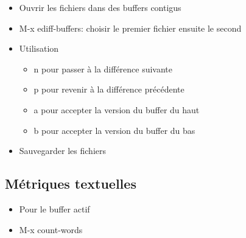 \documentclass[letterpaper, 12pt]{scrartcl}
\begin{document}
\begin{itemize}
\item Ouvrir les fichiers dans des buffers contigus
\item M-x ediff-buffers: choisir le premier fichier ensuite le second
\item Utilisation
\begin{itemize}
\item n pour passer à la différence suivante
\item p pour revenir à la différence précédente
\item a pour accepter la version du buffer du haut
\item b pour accepter la version du buffer du bas
\end{itemize}
\item Sauvegarder les fichiers
\end{itemize}
\subsection{Métriques textuelles}
\label{sec:org5434f5a}

\begin{itemize}
\item Pour le buffer actif
\item M-x count-words
\end{itemize}
\end{document}
